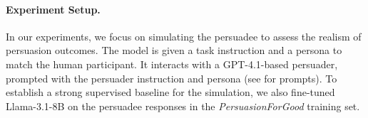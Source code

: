 

\paragraph{Experiment Setup.} 

In our experiments, we focus on simulating the persuadee to assess the realism of persuasion outcomes. The model is given a task instruction and a persona to match the human participant. It interacts with a  GPT-4.1-based persuader, prompted with the persuader instruction and persona (see  for prompts). To establish a strong supervised baseline for the simulation, we also fine-tuned Llama-3.1-8B on the persuadee responses in the \textit{PersuasionForGood} training set. %

